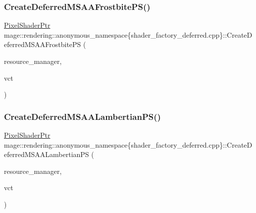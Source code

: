 \subsubsection{\texorpdfstring{Create\+Deferred\+M\+S\+A\+A\+Frostbite\+P\+S()}{CreateDeferredMSAAFrostbitePS()}}
{\footnotesize\ttfamily \mbox{\hyperlink{namespacemage_1_1rendering_af03d922b228ee9c8542baaa2ecc9f259}{Pixel\+Shader\+Ptr}} mage\+::rendering\+::anonymous\+\_\+namespace\{shader\+\_\+factory\+\_\+deferred.\+cpp\}\+::Create\+Deferred\+M\+S\+A\+A\+Frostbite\+PS (\begin{DoxyParamCaption}\item[{\mbox{\hyperlink{classmage_1_1rendering_1_1_resource_manager}{Resource\+Manager}} \&}]{resource\+\_\+manager,  }\item[{bool}]{vct }\end{DoxyParamCaption})}

\mbox{\label{namespacemage_1_1rendering_1_1anonymous__namespace_02shader__factory__deferred_8cpp_03_adcb84ff23d320fddc5dd4b945f88ab06}} 
\subsubsection{\texorpdfstring{Create\+Deferred\+M\+S\+A\+A\+Lambertian\+P\+S()}{CreateDeferredMSAALambertianPS()}}
{\footnotesize\ttfamily \mbox{\hyperlink{namespacemage_1_1rendering_af03d922b228ee9c8542baaa2ecc9f259}{Pixel\+Shader\+Ptr}} mage\+::rendering\+::anonymous\+\_\+namespace\{shader\+\_\+factory\+\_\+deferred.\+cpp\}\+::Create\+Deferred\+M\+S\+A\+A\+Lambertian\+PS (\begin{DoxyParamCaption}\item[{\mbox{\hyperlink{classmage_1_1rendering_1_1_resource_manager}{Resource\+Manager}} \&}]{resource\+\_\+manager,  }\item[{bool}]{vct }\end{DoxyParamCaption})}

